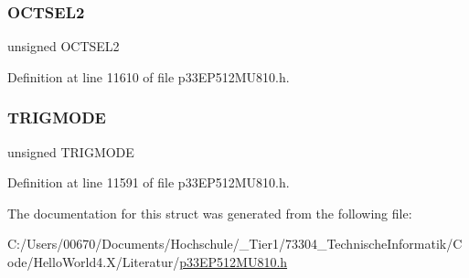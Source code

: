 \subsubsection{\texorpdfstring{O\+C\+T\+S\+E\+L2}{OCTSEL2}}
{\footnotesize\ttfamily unsigned O\+C\+T\+S\+E\+L2}



Definition at line 11610 of file p33\+E\+P512\+M\+U810.\+h.

\mbox{\label{structtag_o_c8_c_o_n1_b_i_t_s_a7a0057e0dca6e2663584b5b9e1da04c3}} 
\subsubsection{\texorpdfstring{T\+R\+I\+G\+M\+O\+DE}{TRIGMODE}}
{\footnotesize\ttfamily unsigned T\+R\+I\+G\+M\+O\+DE}



Definition at line 11591 of file p33\+E\+P512\+M\+U810.\+h.



The documentation for this struct was generated from the following file\+:\begin{DoxyCompactItemize}
\item 
C\+:/\+Users/00670/\+Documents/\+Hochschule/\+\_\+\+Tier1/73304\+\_\+\+Technische\+Informatik/\+Code/\+Hello\+World4.\+X/\+Literatur/\hyperlink{p33_e_p512_m_u810_8h}{p33\+E\+P512\+M\+U810.\+h}\end{DoxyCompactItemize}
